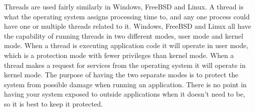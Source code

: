 \documentclass[10pt,serif,draftclsnofoot,onecolumn]{IEEEtran}
\begin{document}
	\par
			Threads are used fairly similarly in Windows, FreeBSD and Linux. A thread is what the operating system assigns processing time to, and any one process could have one or multiple threads related to it. Windows, FreeBSD and Linux all have the capability of running threads in two different modes, user mode and kernel mode\cite{1}. When a thread is executing application code it will operate in user mode, which is a protection mode with fewer privileges than kernel mode. When a thread makes a request for services from the operating system it will operate in kernel mode. The purpose of having the two separate modes is to protect the system from possible damage when running an application. There is no point in having your system exposed to outside applications when it doesn't need to be, so it is best to keep it protected.
			
			
	\newpage


	
	
\end{document}
